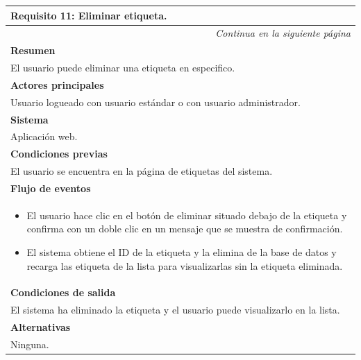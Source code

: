 \begin{longtable}{|p{}|}
\hline
 \rowcolor[gray]{.5}
 \color{white}\textbf{Requisito 11: Eliminar etiqueta.} \\
\hline
\endfirsthead
\endhead
\hline \multicolumn{1}{r}{\textit{Continua en la siguiente página}} \\
\endfoot
\endlastfoot
    \rowcolor[gray]{.9}
    \textbf{Resumen} \\
     \hline
     El usuario puede eliminar una etiqueta en especifico. \\
    \hline
    \rowcolor[gray]{.9}
    \textbf{Actores principales} \\
     \hline
     Usuario logueado con usuario estándar o con usuario administrador. \\
    \hline
    \rowcolor[gray]{.9}
    \textbf{Sistema} \\
     \hline
     Aplicación web. \\
    \hline
    \rowcolor[gray]{.9}
    \textbf{Condiciones previas} \\
     \hline
     El usuario se encuentra en la página de etiquetas del sistema. \\
    \hline
    \rowcolor[gray]{.9}
    \textbf{Flujo de eventos}  \\
     \hline
      \begin{itemize}
        \item El usuario hace clic en el botón de eliminar situado debajo de la etiqueta y confirma con un doble clic en un mensaje que se muestra de confirmación.
        \item El sistema obtiene el ID de la etiqueta y la elimina de la base de datos y recarga las etiqueta de la lista para visualizarlas sin la etiqueta eliminada.
    \end{itemize} \\
    \hline
    \rowcolor[gray]{.9}
    \textbf{Condiciones de salida} \\
     \hline
     El sistema ha eliminado la etiqueta y el usuario puede visualizarlo en la lista. \\
    \hline
    \rowcolor[gray]{.9}
    \textbf{Alternativas}  \\
     \hline
      Ninguna.\\
    \hline
\end{longtable}

